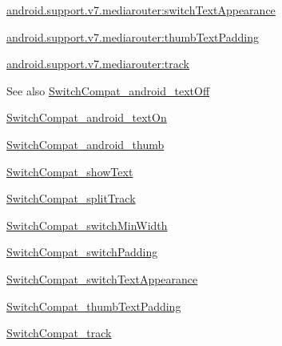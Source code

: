 {\ttfamily \hyperlink{classandroid_1_1support_1_1v7_1_1mediarouter_1_1R_1_1styleable_a7b7c45a6e2f6226aaece7ebb5417ffcb}{android.\+support.\+v7.\+mediarouter\+:switch\+Text\+Appearance}}

{\ttfamily \hyperlink{classandroid_1_1support_1_1v7_1_1mediarouter_1_1R_1_1styleable_a02e44ff90f9d164c673496e2b783fb7d}{android.\+support.\+v7.\+mediarouter\+:thumb\+Text\+Padding}}

{\ttfamily \hyperlink{classandroid_1_1support_1_1v7_1_1mediarouter_1_1R_1_1styleable_a7d3a42dee16a25712492d2908119800b}{android.\+support.\+v7.\+mediarouter\+:track}}

\begin{DoxySeeAlso}{See also}
\hyperlink{classandroid_1_1support_1_1v7_1_1mediarouter_1_1R_1_1styleable_af14c1d76d2ab92ed4bfcba65bd4631ac}{Switch\+Compat\+\_\+android\+\_\+text\+Off} 

\hyperlink{classandroid_1_1support_1_1v7_1_1mediarouter_1_1R_1_1styleable_a2cb5bc58388a9257700ecc950397dd9e}{Switch\+Compat\+\_\+android\+\_\+text\+On} 

\hyperlink{classandroid_1_1support_1_1v7_1_1mediarouter_1_1R_1_1styleable_a73c6dc6f08ec175df6b39b3bbe5e4b9d}{Switch\+Compat\+\_\+android\+\_\+thumb} 

\hyperlink{classandroid_1_1support_1_1v7_1_1mediarouter_1_1R_1_1styleable_af24f7da08cafd932e8fb474f0845baf4}{Switch\+Compat\+\_\+show\+Text} 

\hyperlink{classandroid_1_1support_1_1v7_1_1mediarouter_1_1R_1_1styleable_a318ab94a649fd9ebfa42612d0c77726c}{Switch\+Compat\+\_\+split\+Track} 

\hyperlink{classandroid_1_1support_1_1v7_1_1mediarouter_1_1R_1_1styleable_a352987fa61ad38cf9d576099efe2ad26}{Switch\+Compat\+\_\+switch\+Min\+Width} 

\hyperlink{classandroid_1_1support_1_1v7_1_1mediarouter_1_1R_1_1styleable_a91af30593f8a1dbd3a82d1b6df6ae8b8}{Switch\+Compat\+\_\+switch\+Padding} 

\hyperlink{classandroid_1_1support_1_1v7_1_1mediarouter_1_1R_1_1styleable_a7b7c45a6e2f6226aaece7ebb5417ffcb}{Switch\+Compat\+\_\+switch\+Text\+Appearance} 

\hyperlink{classandroid_1_1support_1_1v7_1_1mediarouter_1_1R_1_1styleable_a02e44ff90f9d164c673496e2b783fb7d}{Switch\+Compat\+\_\+thumb\+Text\+Padding} 

\hyperlink{classandroid_1_1support_1_1v7_1_1mediarouter_1_1R_1_1styleable_a7d3a42dee16a25712492d2908119800b}{Switch\+Compat\+\_\+track} 
\end{DoxySeeAlso}
\mbox{\label{classandroid_1_1support_1_1v7_1_1mediarouter_1_1R_1_1styleable_af14c1d76d2ab92ed4bfcba65bd4631ac}} 

